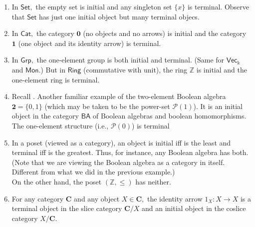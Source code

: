 \begin{enumerate}
	\item In $\mathsf{Set},$ the empty set is initial and any singleton set $\{x\}$ is terminal. Observe that $\mathsf{Set}$ has just one initial object but many terminal objecs.
	\item In $\mathsf{Cat},$ the category $\mathbf{0}$ (no objects and no arrows) is initial and the category $\mathbf{1}$ (one object and its identity arrow) is terminal.
	\item In $\mathsf{Grp},$ the one-element group is both initial and terminal. (Same for $\mathsf{Vec}_\Bbbk$ and $\mathsf{Mon}.$) But in $\mathsf{Ring}$ (commutative with unit), the ring $\mathbb{Z}$ is initial and the one-element ring is terminal.
	\item Recall .
	Another familiar example of the two-element Boolean algebra $\mathbf{2} = \{0, 1\}$ (which may be taken to be the power-set $\mathcal{P}(1)$). It is an initial object in the category $\mathsf{BA}$ of Boolean algebras and boolean homomorphisms.\\
	The one-element structure (i.e., $\mathcal{P}(0)$) is terminal
	\item In a poset (viewed as a category), an object is initial iff is the least and terminal iff is the greatest. Thus, for instance, any Boolean algebra has both. (Note that we are viewing the Boolean algebra as a category in itself. Different from what we did in the previous example.)\\
	On the other hand, the poset $(\mathbb{Z}, \le)$ has neither.
	\item For any category $\mathbf{C}$ and any object $X \in \mathbf{C},$ the identity arrow $1_X:X\to X$ is a terminal object in the slice category $\mathbf{C}/X$ and an initial object in the coslice category $X/\mathbf{C}.$

%
%

\end{enumerate}
